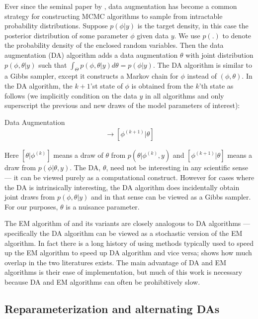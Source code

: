 \documentclass{article}
\begin{document}
Ever since the seminal paper by , data augmentation has become a common strategy for constructing MCMC algorithms to sample from intractable probability distributions. Suppose $p(\phi|y)$ is the target density, in this case the posterior distribution of some parameter $\phi$ given data $y$. We use $p(.)$ to denote the probability density of the enclosed random variables. Then the data augmentation (DA) algorithm adds a data augmentation $\theta$ with joint distribution $p(\phi,\theta|y)$ such that $\int_{\Theta}p(\phi,\theta|y)d\theta = p(\phi|y)$. The DA algorithm is similar to a Gibbs sampler, except it constructs a Markov chain for $\phi$ instead of $(\phi, \theta)$. In the DA algorithm, the $k+1$'st state of $\phi$ is obtained from the $k$'th state as follows (we implicitly condition on the data $y$ in all algorithms and only superscript the previous and new draws of the model parameters of interest):
\begin{alg*}[DA]Data Augmentation\label{alg:DA}
  \begin{align*}
  [\theta|\phi^{(k)}] \to [\phi^{(k+1)}|\theta]
\end{align*}
\end{alg*} 
\noindent Here $[\theta|\phi^{(k)}]$ means a draw of $\theta$ from $p(\theta|\phi^{(k)},y)$ and $[\phi^{(k+1)}|\theta]$ means a draw from $p(\phi|\theta,y)$. The DA, $\theta$, need not be interesting in any scientific sense --- it can be viewed purely as a computational construct. However for cases where the DA is intrinsically interesting, the DA algorithm does incidentally obtain joint draws from $p(\phi,\theta|y)$ and in that sense can be viewed as a Gibbs sampler. For our purposes, $\theta$ is a nuisance parameter.

The EM algorithm of  and its variants are closely analogous to DA algorithms --- specifically the DA algorithm can be viewed as a stochastic version of the EM algorithm. In fact there is a long history of using methods typically used to speed up the EM algorithm to speed up DA algorithm and vice versa;  shows how much overlap in the two literatures exists. The main advantage of DA and EM algorithms is their ease of implementation, but much of this work is necessary because DA and EM algorithms can often be prohibitively slow. 

\subsection{Reparameterization and alternating DAs}
\end{document}
